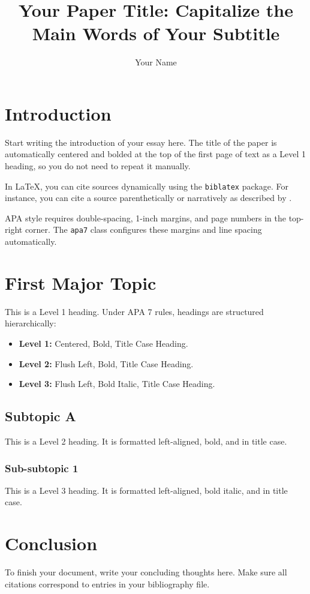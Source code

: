 \documentclass[stu, 12pt, american]{apa7}
\title{Your Paper Title: Capitalize the Main Words of Your Subtitle}
\author{Your Name}
\affiliation{Department of Your Major, Your University Name}
\begin{document}
\maketitle %

\section{Introduction}
Start writing the introduction of your essay here. The title of the paper is automatically centered and bolded at the top of the first page of text as a Level 1 heading, so you do not need to repeat it manually.

In LaTeX, you can cite sources dynamically using the \texttt{biblatex} package. For instance, you can cite a source parenthetically \parencite{sample_article} or narratively as described by \textcite{sample_book}.

APA style requires double-spacing, 1-inch margins, and page numbers in the top-right corner. The \texttt{apa7} class configures these margins and line spacing automatically.

\section{First Major Topic}
This is a Level 1 heading. Under APA 7 rules, headings are structured hierarchically:
\begin{itemize}
    \item \textbf{Level 1:} Centered, Bold, Title Case Heading.
    \item \textbf{Level 2:} Flush Left, Bold, Title Case Heading.
    \item \textbf{Level 3:} Flush Left, Bold Italic, Title Case Heading.
\end{itemize}

\subsection{Subtopic A}
This is a Level 2 heading. It is formatted left-aligned, bold, and in title case.

\subsubsection{Sub-subtopic 1}
This is a Level 3 heading. It is formatted left-aligned, bold italic, and in title case.

\section{Conclusion}
To finish your document, write your concluding thoughts here. Make sure all citations correspond to entries in your bibliography file.

\clearpage
\printbibliography %
\end{document}
